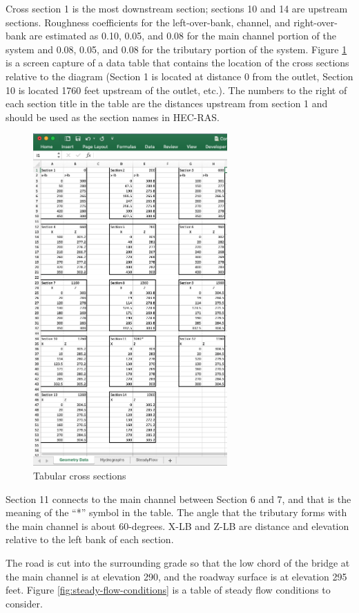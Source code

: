 \documentclass[12pt]{article}
\begin{document}
Cross section 1 is the most downstream section; sections 10 and 14 are upstream sections.  
Roughness coefficients for the left-over-bank, channel, and right-over-bank are estimated as 0.10, 0.05, and 0.08 for the main channel portion of the system and 0.08, 0.05, and 0.08 for the tributary portion of the system.
\clearpage
Figure \ref{fig:cross-sections-table} is a screen capture of a data table that contains the location of the cross sections relative to the diagram (Section 1 is located at distance 0 from the outlet, Section 10 is located 1760 feet upstream of the outlet, etc.).  
The numbers to the right of each section title in the table are the distances upstream from section 1 and should be used as the section names in HEC-RAS.   
\begin{figure}[h!] %
   \centering
   \includegraphics[height=5in]{cross-sections-table.png} 
   \caption{Tabular cross sections }
   \label{fig:cross-sections-table}
\end{figure}
Section 11 connects to the main channel between Section 6 and 7, and that is the meaning of the ``*'' symbol in the table.
The angle that the tributary forms with the main channel is about 60-degrees.
X-LB and Z-LB are distance and elevation relative to the left bank of each section. %

The road is cut into the surrounding grade so that the low chord of the bridge at the main channel is at elevation 290, and the roadway surface is at elevation 295 feet.  
\clearpage
Figure \ref{fig:steady-flow-conditions} is a table of steady flow conditions to consider. 
\end{document}
